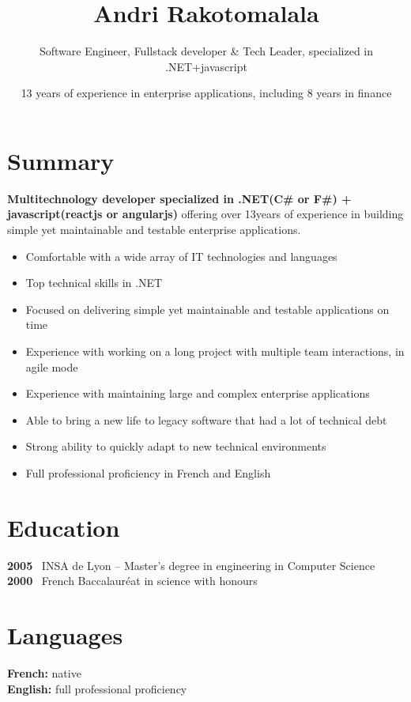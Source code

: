 \documentclass[
]{article}
\title{Andri Rakotomalala}
\subtitle{Software Engineer, Fullstack developer \& Tech Leader, specialized in
.NET+javascript}
\author{13 years of experience in enterprise applications, including 8 years in
finance}
\date{}
\providecommand{\tightlist}{%
  \setlength{\itemsep}{0pt}\setlength{\parskip}{0pt}}
\begin{document}
\maketitle

\hypertarget{summary}{%
\section{Summary}\label{summary}}

\textbf{Multitechnology developer specialized in .NET(C\# or F\#) +
javascript(reactjs or angularjs)} offering over 13years of experience in
building simple yet maintainable and testable enterprise applications.

\begin{itemize}
\tightlist
\item
  Comfortable with a wide array of IT technologies and languages
\item
  Top technical skills in .NET
\item
  Focused on delivering simple yet maintainable and testable
  applications on time
\item
  Experience with working on a long project with multiple team
  interactions, in agile mode
\item
  Experience with maintaining large and complex enterprise applications
\item
  Able to bring a new life to legacy software that had a lot of
  technical debt
\item
  Strong ability to quickly adapt to new technical environments
\item
  Full professional proficiency in French and English
\end{itemize}

\hypertarget{education}{%
\section{Education}\label{education}}

\textbf{2005} ~INSA de Lyon -- Master's degree in engineering in
Computer Science\\
\textbf{2000} ~French Baccalauréat in science with honours

\hypertarget{languages}{%
\section{Languages}\label{languages}}

\textbf{French:} native\\
\textbf{English:} full professional proficiency
\end{document}
